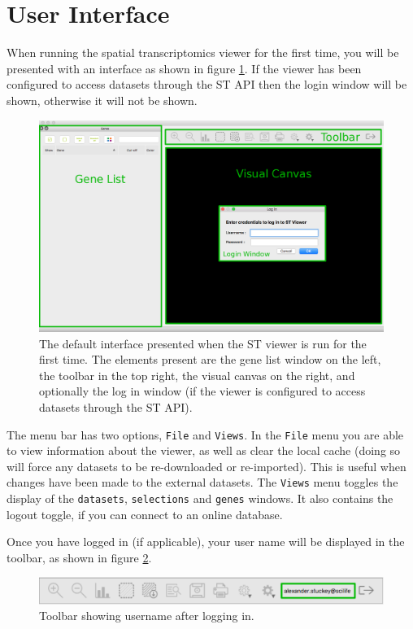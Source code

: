 \documentclass[10pt,a4paper,titlepage]{book}
\begin{document}
\section{User Interface}
 When running the spatial transcriptomics viewer for the first time, you will be presented with an interface as shown in figure \ref{fig:default_view}. If the viewer has been configured to access datasets through the ST API then the login window will be shown, otherwise it will not be shown.
\begin{figure}[h]
	\centering
	\includegraphics[width=0.8\linewidth]{./Pictures/default_logged_out_labelled}
	\caption[The spatial transcriptomics viewer default interface]{The default interface presented when the ST viewer is run for the first time. The elements present are the gene list window on the left, the toolbar in the top right, the visual canvas on the right, and optionally the log in window (if the viewer is configured to access datasets through the ST API).}
	\label{fig:default_view}

\end{figure}

The menu bar has two options, \texttt{File} and \texttt{Views}. In the \texttt{File} menu you are able to view information about the viewer, as well as clear the local cache (doing so will force any datasets to be re-downloaded or re-imported). This is useful when changes have been made to the external datasets. The \texttt{Views} menu toggles the display of the \texttt{datasets}, \texttt{selections} and \texttt{genes} windows. It also contains the logout toggle, if you can connect to an online database.

Once you have logged in (if applicable), your user name will be displayed in the toolbar, as shown in figure \ref{fig:user_name}.
\begin{figure}[h]
	\centering
	\includegraphics[width=0.8\linewidth]{./Pictures/logged_in}
	\caption{Toolbar showing username after logging in.}
	\label{fig:user_name}
\end{figure}
\end{document}
